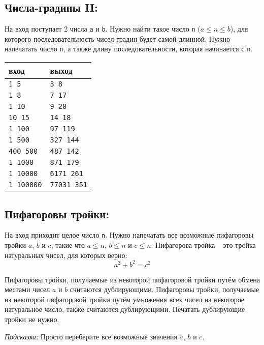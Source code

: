 \documentclass{article}
\begin{document}
\subsection{Числа-градины II:}
На вход поступает 2 числа \texttt{a} и \texttt{b}. Нужно найти такое число \texttt{n} ($a \le n \le b$), для которого последовательность чисел-градин будет самой длинной. Нужно напечатать число \texttt{n}, а также длину последовательности, которая начинается с \texttt{n}.
\begin{center}
\begin{tabular}{ l l }
 вход & выход \\ \hline
 \texttt{1 5}  & \texttt{3 8}  \\ 
 \texttt{1 8} & \texttt{7 17}  \\ 
 \texttt{1 10} & \texttt{9 20}  \\ 
 \texttt{10 15} & \texttt{14 18}  \\ 
 \texttt{1 100} & \texttt{97 119}  \\ 
 \texttt{1 500} & \texttt{327 144}  \\ 
 \texttt{400 500} & \texttt{487 142}  \\ 
 \texttt{1 1000} & \texttt{871 179}  \\ 
 \texttt{1 10000} & \texttt{6171 261}  \\ 
 \texttt{1 100000} & \texttt{77031 351}  \\ 
\end{tabular}
\end{center}



\subsection{Пифагоровы тройки:}
На вход приходит целое число \texttt{n}. Нужно напечатать все возможные пифагоровы тройки $a$, $b$ и $c$, такие что $a \le n$, $b \le n$ и $c \le n$. Пифагорова тройка -- это тройка натуральных чисел, для которых верно:
$$
a^2 + b^2 = c^2
$$

Пифагоровы тройки, получаемые из некоторой пифагоровой тройки путём обмена местами чисел $a$ и $b$ считаются дублирующими. Пифагоровы тройки, получаемые из некоторой пифагоровой тройки путём умножения всех чисел на некоторое натуральное число, также считаются дублирующими. Печатать дублирующие тройки не нужно.

\textit{Подсказка:} Просто переберите все возможные значения $a$, $b$ и $c$.
\end{document}
